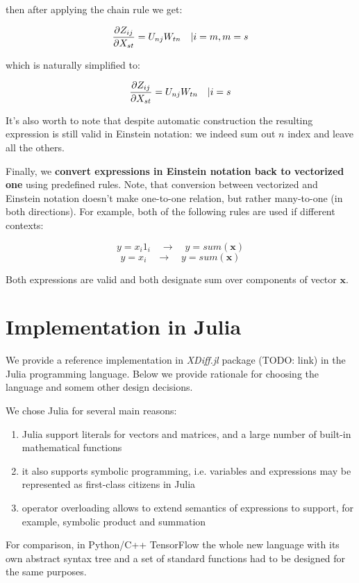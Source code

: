 \documentclass[conference]{IEEEtran}
\begin{document}
then after applying the chain rule we get:

$$\pdv{Z_{ij}}{X_{st}} = U_{nj}W_{tn} \quad | i = m, m = s$$

which is naturally simplified to:

$$\pdv{Z_{ij}}{X_{st}} = U_{nj}W_{tn} \quad | i = s$$

It's also worth to note that despite automatic construction the
resulting expression is still valid in Einstein notation: we indeed
sum out $n$ index and leave all the others.

Finally, we \textbf{convert expressions in Einstein notation back to
  vectorized one} using predefined rules. Note, that conversion
between vectorized and Einstein notation doesn't make one-to-one
relation, but rather many-to-one (in both directions). For example,
both of the following rules are used if different contexts:

$$y = x_i1_i \quad \rightarrow \quad y = sum(\pmb{x})$$
$$y = x_i \quad \rightarrow \quad y = sum(\pmb{x})$$

Both expressions are valid and both designate sum over components of vector $\pmb{x}$. 

\section{Implementation in Julia}

We provide a reference implementation in \textit{XDiff.jl} package
(TODO: link) in the Julia programming language. Below we provide
rationale for choosing the language and somem other design decisions.

We chose Julia for several main reasons:

\begin{enumerate}
\item Julia support literals for vectors and matrices, and a large
  number of built-in mathematical functions
\item it also supports symbolic programming, i.e. variables and
  expressions may be represented as first-class citizens in Julia
\item operator overloading allows to extend semantics of expressions
  to support, for example, symbolic product and summation
\end{enumerate}

For comparison, in Python/C++ TensorFlow the whole new language with
its own abstract syntax tree and a set of standard functions had to be
designed for the same purposes.
\end{document}
